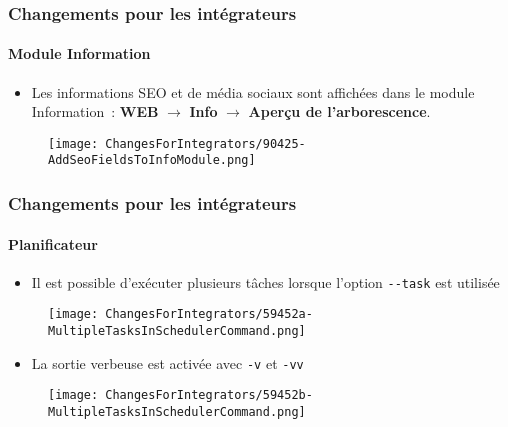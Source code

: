 
\begin{frame}[fragile]
	\frametitle{Changements pour les intégrateurs}
	\framesubtitle{Module Information}

	\begin{itemize}
		\item Les informations SEO et de média sociaux sont affichées dans le module Information~:\newline
			\textbf{WEB} $\rightarrow$ \textbf{Info} $\rightarrow$ \textbf{Aperçu de l'arborescence}.
	\end{itemize}

	\begin{figure}
		\texttt{[image: ChangesForIntegrators/90425-AddSeoFieldsToInfoModule.png]}
	\end{figure}

\end{frame}


\begin{frame}[fragile]
	\frametitle{Changements pour les intégrateurs}
	\framesubtitle{Planificateur}

	\lstset{basicstyle=\tiny\ttfamily}

	\begin{itemize}
		\item Il est possible d'exécuter plusieurs tâches lorsque l'option \texttt{-}\texttt{-}\texttt{task} est utilisée
	\end{itemize}

	\begin{figure}
		\texttt{[image: ChangesForIntegrators/59452a-MultipleTasksInSchedulerCommand.png]}
	\end{figure}

	\begin{itemize}
		\item La sortie verbeuse est activée avec \texttt{-}\texttt{v} et \texttt{-}\texttt{vv}
	\end{itemize}

	\begin{figure}
		\texttt{[image: ChangesForIntegrators/59452b-MultipleTasksInSchedulerCommand.png]}
	\end{figure}

\end{frame}

